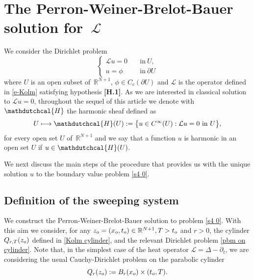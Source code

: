 \documentclass{amsart}
\numberwithin{equation}{section}
\def \p{{\phi}}
\def \Lc{{\mathcal{L}}}
\def \r{{\mathbb{R}}}
\def \Hd{{\mathdutchcal{H}}}
\begin{document}
{\section{The {Perron-Weiner-Brelot-Bauer} solution for~$\Lc$}\label{sec:4}
We consider the Dirichlet problem 
\begin{equation} \label{s4 0}
\begin{cases}
		\Lc u = 0 & \quad  \text{in}\ U,\\
		u = \p & \quad  \text{in}\ \partial U		
\end{cases}
\end{equation}
where $U$ is an open subset of~$\r^{N+1}$, $\p \in {C}_c(\partial U)$ and $\Lc$ is the operator defined in \eqref{e-Kolm} satisfying hypothesis {\bf[H.1]}. As we are interested in classical solution to $\Lc u = 0$, throughout the sequel of this article we denote with $\Hd$ the harmonic sheaf defined as
\begin{equation} \label{sheaf of solution}
	U \longmapsto \Hd(U):=\big\{u \in {C}^\infty(U): \Lc u = 0 \mbox{ in } U \big\},
\end{equation}
for every open set $U$ of~$\r^{N+1}$ and we say that a function $u$ is harmonic in an open set $U$ if $u \in \Hd(U)$. 

We next discuss the main steps of the procedure that provides us with the unique solution $u$ to the boundary value problem \eqref{s4 0}.

\subsection{Definition of the sweeping system}

We construct the {{Perron-Weiner-Brelot-Bauer}} solution to problem \eqref{s4 0}. With this aim we consider, for any $z_{\rm o} = (x_{\rm o},t_{\rm o}) \in \r^{N+1}, T > t_{\rm o}$ and $r>0$, the cylinder ${Q}_{r,T}(z_{\rm o})$ defined in \eqref{Kolm cylinder}, and the relevant Dirichlet problem \eqref{pbm on cylinder}. Note that, in the simplest case of the heat operator $\Lc = \Delta -\partial_t$, we are considering the usual Cauchy-Dirichlet problem on the parabolic cylinder
\begin{equation} \label{parabolic cylinder}
	{Q}_r(z_{\rm o}):= B_r(x_{\rm o}) \times ( t_{\rm o}, T). 
\end{equation}

}
\end{document}
